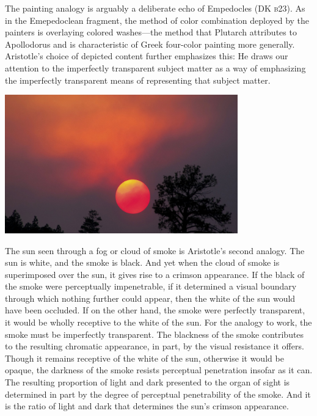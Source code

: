 The painting analogy is arguably a deliberate echo of Empedocles (DK \textsc{b}23). As in the Emepedoclean fragment, the method of color combination deployed by the painters is overlaying colored washes---the method that Plutarch attributes to Apollodorus and is characteristic of Greek four-color painting more generally. Aristotle's choice of depicted content further emphasizes this: He draws our attention to the imperfectly transparent subject matter as a way of emphasizing the imperfectly transparent means of representing that subject matter. \change

\begin{frame}
	\begin{center}
		\includegraphics[height=6cm]{../../graphics/red_sun.jpg}
	\end{center}
\end{frame}

The sun seen through a fog or cloud of smoke is Aristotle's second analogy. The sun is white, and the smoke is black. And yet when the cloud of smoke is superimposed over the sun, it gives rise to a crimson appearance. If the black of the smoke were perceptually impenetrable, if it determined a visual boundary through which nothing further could appear, then the white of the sun would have been occluded. If on the other hand, the smoke were perfectly transparent, it would be wholly receptive to the white of the sun. For the analogy to work, the smoke must be imperfectly transparent. The blackness of the smoke contributes to the resulting chromatic appearance, in part, by the visual resistance it offers. Though it remains receptive of the white of the sun, otherwise it would be opaque, the darkness of the smoke resists perceptual penetration insofar as it can. The resulting proportion of light and dark presented to the organ of sight is determined in part by the degree of perceptual penetrability of the smoke. And it is the ratio of light and dark that determines the sun's crimson appearance.

